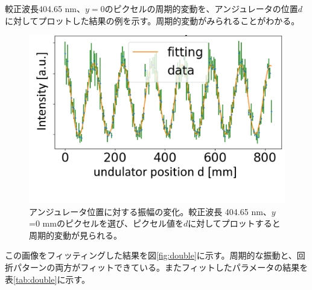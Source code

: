 \documentclass[a4paper,11pt,uplatex]{jsbook}
\begin{document}
較正波長404.65 nm、$y = 0$のピクセルの周期的変動を、アンジュレータの位置$d$に対してプロットした結果の例を示す。周期的変動がみられることがわかる。
\begin{figure}[H]
  \centering
  \includegraphics[width=0.8\linewidth]{image/4-oscillation.png}
  \caption[アンジュレータ位置に対する振幅の変化]{アンジュレータ位置に対する振幅の変化。較正波長 404.65 nm、$y$ =0 mmのピクセルを選び、ピクセル値を$d$に対してプロットすると周期的変動が見られる。}
\end{figure}
この画像をフィッティングした結果を図\ref{fig:double}に示す。周期的な振動と、回折パターンの両方がフィットできている。またフィットしたパラメータの結果を表\ref{tab:double}に示す。
\end{document}
